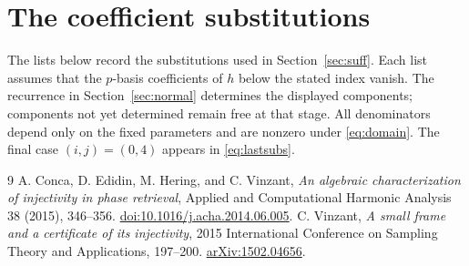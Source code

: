 \documentclass[11pt,a4paper]{article}
\begin{document}
\appendix
\section{The coefficient substitutions}\label{app:subs}
The lists below record the substitutions used in Section~\ref{sec:suff}.
Each list assumes that the $p$-basis coefficients of $h$ below the stated
index vanish. The recurrence in Section~\ref{sec:normal} determines the
displayed components; components not yet determined remain free at that
stage. All denominators
depend only on the fixed parameters and are nonzero under \eqref{eq:domain}.
The final case $(i,j)=(0,4)$ appears in \eqref{eq:lastsubs}.


\begin{thebibliography}{9}
 A. Conca, D. Edidin, M. Hering, and C. Vinzant,
\emph{An algebraic characterization of injectivity in phase retrieval},
Applied and Computational Harmonic Analysis 38 (2015), 346--356.
\href{https://doi.org/10.1016/j.acha.2014.06.005}{doi:10.1016/j.acha.2014.06.005}.
 C. Vinzant, \emph{A small frame and a certificate of its injectivity},
2015 International Conference on Sampling Theory and Applications, 197--200.
\href{https://arxiv.org/abs/1502.04656}{arXiv:1502.04656}.
\end{thebibliography}
\end{document}
